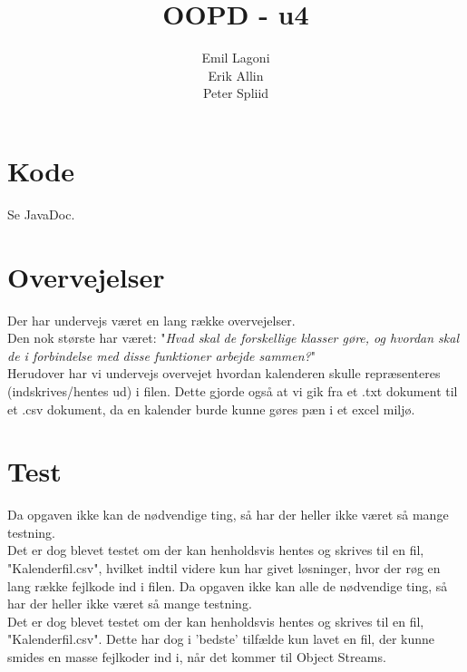 \documentclass[a4paper,11pt]{article}
\title{\textbf{OOPD - u4}}
\author{Emil Lagoni\\Erik Allin\\Peter Spliid}
\begin{document}
\maketitle
\section*{Kode}
Se JavaDoc.


\section*{Overvejelser}
Der har undervejs været en lang række overvejelser. \\
Den nok største har været: "\textit{Hvad skal de forskellige klasser gøre, og hvordan skal de i forbindelse med disse funktioner arbejde sammen?}" \\
Herudover har vi undervejs overvejet hvordan kalenderen skulle repræsenteres (indskrives/hentes ud) i filen. Dette gjorde også at vi gik fra et .txt dokument til et .csv dokument, da en kalender burde kunne gøres pæn i et excel miljø.

\section*{Test}
Da opgaven ikke kan de nødvendige ting, så har der heller ikke været så mange testning. \\
Det er dog blevet testet om der kan henholdsvis hentes og skrives til en fil, "Kalenderfil.csv", hvilket indtil videre kun har givet løsninger, hvor der røg en lang række fejlkode ind i filen.
Da opgaven ikke kan alle de nødvendige ting, så har der heller ikke været så mange testning. \\
Det er dog blevet testet om der kan henholdsvis hentes og skrives til en fil, "Kalenderfil.csv". Dette har dog i 'bedste' tilfælde kun lavet en fil, der kunne smides en masse fejlkoder ind i, når det kommer til Object Streams.
\end{document}
